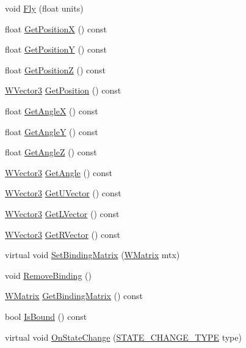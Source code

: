 \begin{DoxyCompactItemize}
\item 
void \hyperlink{class_w_orientation_a4837da349ca24d978d3a8c1545a5f25a}{Fly} (float units)
\item 
float \hyperlink{class_w_orientation_ae09d7d93bbd88e4347ef4aadea94cb88}{Get\+PositionX} () const 
\item 
float \hyperlink{class_w_orientation_aef8b5b28301ff4b5f92656b7c6e500f5}{Get\+PositionY} () const 
\item 
float \hyperlink{class_w_orientation_a0c6a47acdb267298165c5a60daabac54}{Get\+PositionZ} () const 
\item 
\hyperlink{class_w_vector3}{W\+Vector3} \hyperlink{class_w_orientation_a2739c58a32bb8141bde6636fd31f6eb8}{Get\+Position} () const 
\item 
float \hyperlink{class_w_orientation_a587d26b89ba56a6cb224a5e97cc891c2}{Get\+AngleX} () const 
\item 
float \hyperlink{class_w_orientation_a1cfeabfcaa75ecbf411311af08685723}{Get\+AngleY} () const 
\item 
float \hyperlink{class_w_orientation_ac1311b6bcc36286b0a7318df9e0e6f18}{Get\+AngleZ} () const 
\item 
\hyperlink{class_w_vector3}{W\+Vector3} \hyperlink{class_w_orientation_ae1d3adbbc48f8847fec24044da2372c8}{Get\+Angle} () const 
\item 
\hyperlink{class_w_vector3}{W\+Vector3} \hyperlink{class_w_orientation_ad23f7b1ad75ad5ea25f613763aad0636}{Get\+U\+Vector} () const 
\item 
\hyperlink{class_w_vector3}{W\+Vector3} \hyperlink{class_w_orientation_a7bb1b85ada5a44779d60cded3bf68b39}{Get\+L\+Vector} () const 
\item 
\hyperlink{class_w_vector3}{W\+Vector3} \hyperlink{class_w_orientation_a4ea7f64b238a7962d4aab3b85ab8db8c}{Get\+R\+Vector} () const 
\item 
virtual void \hyperlink{class_w_orientation_a6fa2b52c1a026c084d24ccfa4064162a}{Set\+Binding\+Matrix} (\hyperlink{class_w_matrix}{W\+Matrix} mtx)
\item 
void \hyperlink{class_w_orientation_a1ee756bc440d653a12218b4b90d98ece}{Remove\+Binding} ()
\item 
\hyperlink{class_w_matrix}{W\+Matrix} \hyperlink{class_w_orientation_abe837553506e924f54c7cb3dc75b40f7}{Get\+Binding\+Matrix} () const 
\item 
bool \hyperlink{class_w_orientation_a1f759ccc89e722caa234f56ff15f856e}{Is\+Bound} () const 
\item 
virtual void \hyperlink{class_w_orientation_aa765b7dcd772bbcc511c2c9317e7693c}{On\+State\+Change} (\hyperlink{_w_orientation_8h_afe94de0a48bbd7b343ab18bc318cef28}{S\+T\+A\+T\+E\+\_\+\+C\+H\+A\+N\+G\+E\+\_\+\+T\+Y\+PE} type)
\end{DoxyCompactItemize}



